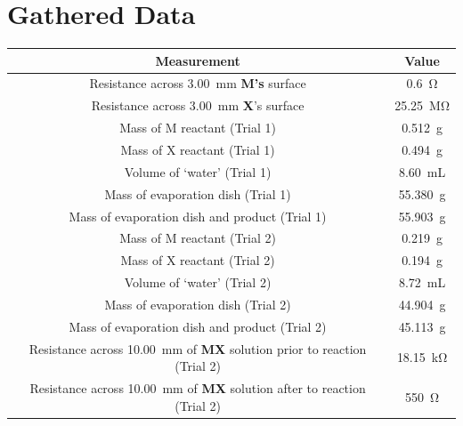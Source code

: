 \documentclass[titlepage]{article}
\begin{document}
%


\section{Gathered Data}
\begin{tabular}{ |c|c| }
    \hline
    Measurement & Value \\
    \hline
    Resistance across \qty{3.00}{\milli\meter} \textbf{M's} surface & \qty{0.6}{\ohm} \\
    Resistance across \qty{3.00}{\milli\meter} \textbf{X}'s surface & \qty{25.25}{\mega\ohm} \\
    Mass of M reactant (Trial 1) &  \qty{0.512}{\gram}\\
    Mass of X reactant (Trial 1) & \qty{0.494}{\gram} \\
    Volume of `water' (Trial 1) & \qty{8.60}{\milli\liter} \\
    Mass of evaporation dish (Trial 1) & \qty{55.380}{\gram} \\
    Mass of evaporation dish and product (Trial 1) & \qty{55.903}{\gram} \\
    Mass of M reactant (Trial 2) & \qty{0.219}{\gram} \\
    Mass of X reactant (Trial 2) & \qty{0.194}{\gram} \\
    Volume of `water' (Trial 2) & \qty{8.72}{\milli\liter} \\
    Mass of evaporation dish (Trial 2) & \qty{44.904}{\gram} \\
    Mass of evaporation dish and product (Trial 2) & \qty{45.113}{\gram} \\
    Resistance across \qty{10.00}{\milli\meter} of \textbf{MX} solution prior to reaction (Trial 2) & \qty{18.15}{\kilo\ohm} \\
    Resistance across \qty{10.00}{\milli\meter} of \textbf{MX} solution after to reaction (Trial 2) & \qty{550}{\ohm} \\
    \hline
    \end{tabular}
\end{document}
